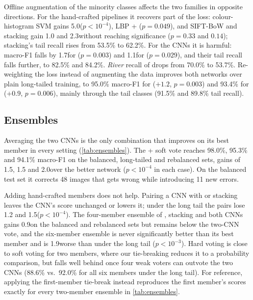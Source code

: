 Offline augmentation of the minority classes affects the two families in opposite directions.
For the hand-crafted pipelines it recovers part of the loss: colour-histogram SVM gains 5.0\pp ($p<10^{-4}$), LBP + \pp ($p=0.049$), and SIFT-BoW and stacking gain 1.0 and 2.3\pp without reaching significance ($p=0.33$ and $0.14$); stacking's tail recall rises from 53.5\% to 62.2\%.
For the CNNs it is harmful: macro-F1 falls by 1.7\pp for \rn ($p=0.003$) and 1.1\pp for \eb ($p=0.029$), and their tail recall falls further, to 82.5\% and 84.2\%.
\emph{River} recall of \rn drops from 70.0\% to 53.7\%.
Re-weighting the loss instead of augmenting the data improves both networks over plain long-tailed training, to 95.0\% macro-F1 for \rn ($+1.2$\pp, $p=0.003$) and 93.4\% for \eb ($+0.9$\pp, $p=0.006$), mainly through the tail classes (91.5\% and 89.8\% tail recall).

\subsection{Ensembles}
\label{sec:res_ensembles}
Averaging the two CNNs is the only combination that improves on its best member in every setting (\cref{tab:ensembles}).
The \rn + \eb soft vote reaches 98.0\%, 95.3\% and 94.1\% macro-F1 on the balanced, long-tailed and rebalanced sets, gains of 1.5, 1.5 and 2.0\pp over the better network ($p<10^{-4}$ in each case).
On the balanced test set it corrects 48 images that \eb gets wrong while introducing 11 new errors.

Adding hand-crafted members does not help.
Pairing a CNN with \knn or stacking leaves the CNN's score unchanged or lowers it; under the long tail the \knn pairs lose 1.2 and 1.5\pp ($p<10^{-4}$).
The four-member ensemble of \knn, stacking and both CNNs gains 0.9\pp on the balanced and rebalanced sets but remains below the two-CNN vote, and the six-member ensemble is never significantly better than its best member and is 1.9\pp worse than \rn under the long tail ($p<10^{-3}$).
Hard voting is close to soft voting for two members, where our tie-breaking reduces it to a probability comparison, but falls well behind once four weak voters can outvote the two CNNs (88.6\% vs.\ 92.0\% for all six members under the long tail).
For reference, applying the first-member tie-break instead reproduces the first member's scores exactly for every two-member ensemble in \cref{tab:ensembles}.

